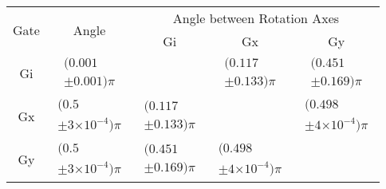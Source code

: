 \documentclass{article}[11pt]
\providecommand{\e}[1]{\ensuremath{\times 10^{#1}}}
\begin{document}
\begin{table}[h]
\begin{center}
\vspace{2em}
\begin{tabular}[l]{|c|c|c|c|c|}
\hline
\multirow{2}{*}{Gate} & \multirow{2}{*}{Angle} & \multicolumn{3}{c|}{Angle between Rotation Axes} \\ \cline{3-5}
 & & Gi & Gx & Gy \\ \hline
Gi & $ \begin{array}{c}(0.001 \\ \pm 0.001)\pi \end{array} $ &  & $ \begin{array}{c}(0.117 \\ \pm 0.133)\pi \end{array} $ & $ \begin{array}{c}(0.451 \\ \pm 0.169)\pi \end{array} $ \\ \hline
Gx & $ \begin{array}{c}(0.5 \\ \pm 3\e{-4})\pi \end{array} $ & $ \begin{array}{c}(0.117 \\ \pm 0.133)\pi \end{array} $ &  & $ \begin{array}{c}(0.498 \\ \pm 4\e{-4})\pi \end{array} $ \\ \hline
Gy & $ \begin{array}{c}(0.5 \\ \pm 3\e{-4})\pi \end{array} $ & $ \begin{array}{c}(0.451 \\ \pm 0.169)\pi \end{array} $ & $ \begin{array}{c}(0.498 \\ \pm 4\e{-4})\pi \end{array} $ &  \\ \hline
\end{tabular}


\end{center}
\end{table}
\end{document}
